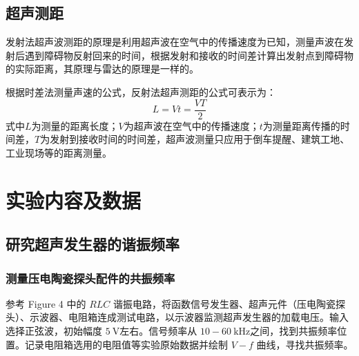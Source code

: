\documentclass[12pt]{article}
\begin{document}
\subsection{超声测距}

发射法超声波测距的原理是利用超声波在空气中的传播速度为已知，测量声波在发射后遇到障碍物反射回来的时间，根据发射和接收的时间差计算出发射点到障碍物的实际距离，其原理与雷达的原理是一样的。

根据时差法测量声速的公式，反射法超声测距的公式可表示为：
\begin{equation}
    L = Vt = \frac{VT}{2}
\end{equation}
式中\( L \)为测量的距离长度；\( V \)为超声波在空气中的传播速度；\( t \)为测量距离传播的时间差，\( T \)为发射到接收时间的时间差，超声波测量只应用于倒车提醒、建筑工地、工业现场等的距离测量。

\section{实验内容及数据}
\subsection{研究超声发生器的谐振频率}
\subsubsection{测量压电陶瓷探头配件的共振频率}

参考 Figure 4 中的 $RLC$ 谐振电路，将函数信号发生器、超声元件（压电陶瓷探头）、示波器、电阻箱连成测试电路，以示波器监测超声发生器的加载电压。输入选择正弦波，初始幅度 $5\ \mathrm V$左右。信号频率从 $10 - 60\ \mathrm {kHz}$之间，找到共振频率位置。记录电阻箱选用的电阻值等实验原始数据并绘制 $V - f$ 曲线，寻找共振频率。
\end{document}
